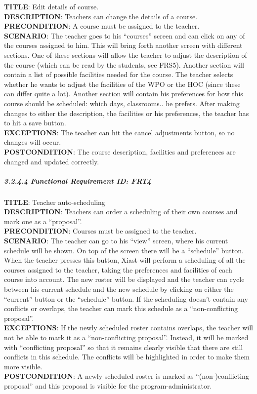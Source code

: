 \documentclass[12pt]{article}
\begin{document}
\textbf{TITLE}: Edit details of course.\\\textbf{DESCRIPTION}: Teachers
can change the details of a course.\\\textbf{PRECONDITION}: A course
must be assigned to the teacher.\\\textbf{SCENARIO}: The teacher goes to
his ``courses'' screen and can click on any of the courses assigned to
him. This will bring forth another screen with different sections. One
of these sections will allow the teacher to adjust the description of
the course (which can be read by the students, see FRS5). Another
section will contain a list of possible facilities needed for the
course. The teacher selects whether he wants to adjust the facilities of
the WPO or the HOC (since these can differ quite a lot). Another section
will contain his preferences for how this course should be scheduled:
which days, classrooms.. he prefers. After making changes to either the
description, the facilities or his preferences, the teacher has to hit a
save button.\\\textbf{EXCEPTIONS}: The teacher can hit the cancel
adjustments button, so no changes will occur.\\\textbf{POSTCONDITION}:
The course description, facilities and preferences are changed and
updated correctly.

\subparagraph{3.2.4.4 Functional Requirement \textbf{ID}:
FRT4\\}\label{functional-requirement-id-frt4}

\textbf{TITLE}: Teacher auto-scheduling\\\textbf{DESCRIPTION}: Teachers
can order a scheduling of their own courses and mark one as a
``proposal''.\\\textbf{PRECONDITION}: Courses must be assigned to the
teacher.\\\textbf{SCENARIO}: The teacher can go to his ``view'' screen,
where his current schedule will be shown. On top of the screen there
will be a ``schedule'' button. When the teacher presses this button,
Xiast will perform a scheduling of all the courses assigned to the
teacher, taking the preferences and facilities of each course into
account. The new roster will be displayed and the teacher can cycle
between his current schedule and the new schedule by clicking on either
the ``current'' button or the ``schedule'' button. If the scheduling
doesn't contain any conflicts or overlaps, the teacher can mark this
schedule as a ``non-conflicting proposal''.\\\textbf{EXCEPTIONS}: If the
newly scheduled roster contains overlaps, the teacher will not be able
to mark it as a ``non-conflicting proposal''. Instead, it will be marked
with ``conflicting proposal'' so that it remains clearly visible that
there are still conflicts in this schedule. The conflicts will be
highlighted in order to make them more visible.\\\textbf{POSTCONDITION}:
A newly scheduled roster is marked as ``(non-)conflicting proposal'' and
this proposal is visible for the program-administrator.
\end{document}
